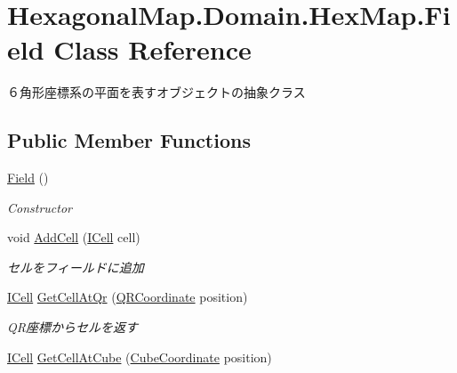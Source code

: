 \hypertarget{class_hexagonal_map_1_1_domain_1_1_hex_map_1_1_field}{}\section{Hexagonal\+Map.\+Domain.\+Hex\+Map.\+Field Class Reference}
\label{class_hexagonal_map_1_1_domain_1_1_hex_map_1_1_field}


６角形座標系の平面を表すオブジェクトの抽象クラス  


\subsection*{Public Member Functions}
\begin{DoxyCompactItemize}
\item 
\mbox{\hyperlink{class_hexagonal_map_1_1_domain_1_1_hex_map_1_1_field_ac69714e5b08a8cdddf5d3a2f3aa27b71}{Field}} ()
\begin{DoxyCompactList}\small\item\em Constructor \end{DoxyCompactList}\item 
void \mbox{\hyperlink{class_hexagonal_map_1_1_domain_1_1_hex_map_1_1_field_ab022ecaed4c11eb5f1d06a77f2f3cd9f}{Add\+Cell}} (\mbox{\hyperlink{interface_hexagonal_map_1_1_domain_1_1_hex_map_1_1_i_cell}{I\+Cell}} cell)
\begin{DoxyCompactList}\small\item\em セルをフィールドに追加 \end{DoxyCompactList}\item 
\mbox{\hyperlink{interface_hexagonal_map_1_1_domain_1_1_hex_map_1_1_i_cell}{I\+Cell}} \mbox{\hyperlink{class_hexagonal_map_1_1_domain_1_1_hex_map_1_1_field_a3479cf0b4b514e3172a449d09ad77e30}{Get\+Cell\+At\+Qr}} (\mbox{\hyperlink{struct_hexagonal_map_1_1_domain_1_1_hex_map_1_1_q_r_coordinate}{Q\+R\+Coordinate}} position)
\begin{DoxyCompactList}\small\item\em Q\+R座標からセルを返す \end{DoxyCompactList}\item 
\mbox{\hyperlink{interface_hexagonal_map_1_1_domain_1_1_hex_map_1_1_i_cell}{I\+Cell}} \mbox{\hyperlink{class_hexagonal_map_1_1_domain_1_1_hex_map_1_1_field_a0c3fd9988752cca3d153d606004c9d01}{Get\+Cell\+At\+Cube}} (\mbox{\hyperlink{struct_hexagonal_map_1_1_domain_1_1_hex_map_1_1_cube_coordinate}{Cube\+Coordinate}} position)

\end{DoxyCompactItemize}
